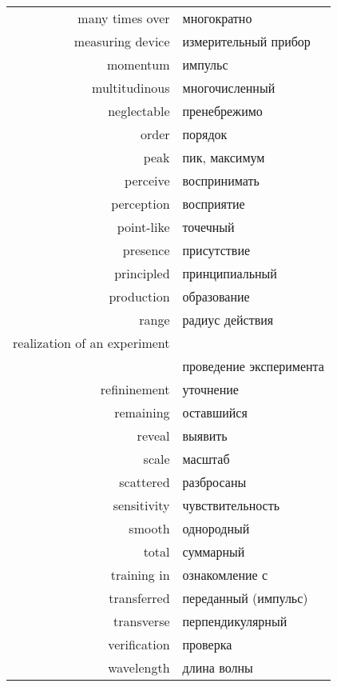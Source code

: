 \documentclass[12pt, a4paper]{article}
\begin{document}
\begin{multicols}{2}
\centering
\begin{tabular}{rl}
	many times over & многократно\\
measuring device & измерительный прибор \\
momentum & импульс \\
multitudinous & многочисленный \\
neglectable & пренебрежимо \\
order & порядок \\
peak & пик, максимум \\
perceive & воспринимать \\
perception & восприятие \\
point-like & точечный \\
presence & присутствие \\
principled & принципиальный\\
production & образование \\
range & радиус действия \\
realization of an experiment \hspace*{-3cm}& \\
& \hspace*{-1cm}проведение эксперимента \\
refininement & уточнение \\
remaining & оставшийся \\
reveal & выявить \\
scale & масштаб \\
scattered & разбросаны \\
sensitivity & чувствительность \\
smooth & однородный \\
total & суммарный \\
training in & ознакомление с \\
transferred & переданный (импульс)\\
transverse & перпендикулярный \\
verification & проверка \\
wavelength & длина волны \\

\end{tabular}

\end{multicols}
\end{document}
